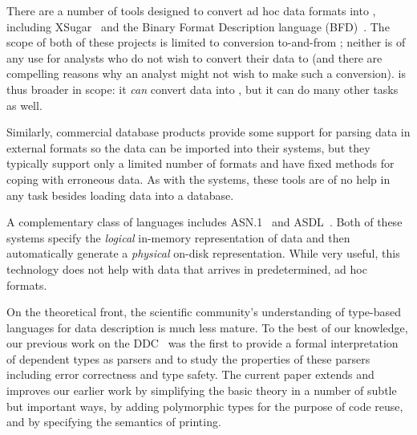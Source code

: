 There are a number of tools designed to convert ad hoc
data formats into \xml{}, including
XSugar~\cite{brabrand+:xsugar2005} and the Binary Format Description
language (BFD)~\cite{bfd}. The scope of both of these projects is
limited to conversion to-and-from \xml{};  neither is of any use for analysts who do not wish to convert their data to \xml{} (and there are compelling reasons why an analyst might not wish to make such a conversion). \padsml{} is thus broader in scope: it \textit{can} convert data into \xml{}, but it can do many other tasks as well.  




Similarly, commercial database products provide some support for
parsing data in external formats so the data can be imported into
their systems, but they typically support only a limited number of
formats and have fixed methods for coping with erroneous data.  
As with the \xml{} systems, these tools are of no help in any task besides loading data into a database.

A complementary class of languages includes
\textsc{ASN.1}~\cite{asn} and \textsc{ASDL}~\cite{asdl}.  Both of
these systems specify the {\em logical\/} in-memory representation of
data and then automatically generate a {\em physical\/} on-disk
representation.  While very useful, this technology does not help with data that
arrives in predetermined, ad hoc formats.

On the theoretical front, the scientific community's understanding of
type-based languages for data description is much less mature.  To the
best of our knowledge, our previous work on the
DDC~\cite{fisher+:next700ddl} was the first to provide a formal
interpretation of dependent types as parsers and to study the
properties of these parsers including error correctness and type
safety.  The current paper extends and improves our earlier work by
simplifying the basic theory in a number of subtle but important ways,
by adding polymorphic types for the purpose of code reuse, and by specifying the semantics of printing.

